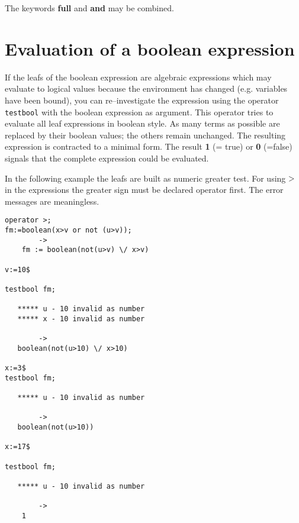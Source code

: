 The keywords {\bf full} and {\bf and} may be combined.

\section{Evaluation of a boolean expression}

If the leafs of the boolean expression are algebraic expressions
which may evaluate to logical values because the environment
has changed (e.g. variables have been bound), you can re--investigate
the expression using the operator {\tt testbool} with the boolean
expression as argument. This operator tries to evaluate all
leaf expressions in \REDUCE boolean style. As many
terms as possible are replaced by their boolean values; the others
remain unchanged. The resulting expression is contracted to a
minimal form. The result {\bf 1} (= true) or {\bf 0} (=false)
signals that the complete expression could be evaluated. 

In the following example the leafs are built as numeric greater test.
For using ${\bf >}$ in the expressions the greater sign must
be declared operator first. The error messages are meaningless.
\begin{verbatim}
operator >;
fm:=boolean(x>v or not (u>v));
        ->
    fm := boolean(not(u>v) \/ x>v)

v:=10$

testbool fm;

   ***** u - 10 invalid as number
   ***** x - 10 invalid as number

        ->
   boolean(not(u>10) \/ x>10)

x:=3$
testbool fm;

   ***** u - 10 invalid as number

        ->
   boolean(not(u>10))

x:=17$

testbool fm;

   ***** u - 10 invalid as number
      
        ->
    1
 
\end{verbatim}


